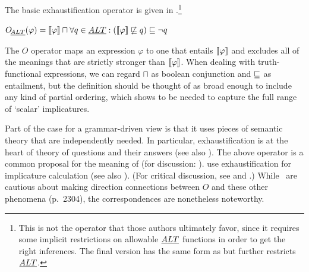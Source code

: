 \documentclass[leqno]{article}
\begin{document}
The basic exhaustification operator is given in 
\citep{Spector:2007,Fox:2007,Fox:2009,Magri:2009,ChierchiaFoxSpector08}.\footnote{This
  is not the operator that those authors ultimately favor, since it
  requires some implicit restrictions on allowable $\emph{ALT}$ functions in
  order to get the right inferences.  The final version has the same
  form as  but further restricts $\emph{ALT}$.}
%
\begin{examples}
\item\label{def:O}
  $\mathop{O\negthinspace_{\emph{ALT}}}(\varphi) = 
  \llbracket\varphi\rrbracket \sqcap 
  \forall q \in \emph{ALT} : (\llbracket\varphi\rrbracket \not\sqsubseteq q) \sqsubseteq \neg q$
\end{examples}
%
The $O$ operator maps an expression $\varphi$ to one that entails
$\llbracket\varphi\rrbracket$ and excludes all of the meanings that are strictly
stronger than $\llbracket\varphi\rrbracket$. When dealing with truth-functional
expressions, we can regard $\sqcap$ as boolean conjunction and
$\sqsubseteq$ as entailment, but the definition should be thought of as
broad enough to include any kind of partial ordering, which
 shows to be needed to capture the full
range of `scalar' implicatures.

Part of the case for a grammar-driven view is that it uses pieces of
semantic theory that are independently needed. In particular,
exhaustification is at the heart of  theory
of questions and their answers (see also
\citealt{JohnMcCarthy80}). The above operator is a common proposal for
the meaning of  (for discussion:
\citealt{Rooth96,Buring01,BeaverClark08}).  \citet{SchulzVanRooij06}
use exhaustification for implicature calculation (see also
\citealt{deJagerVanRooij07}).  (For critical discussion, see
\citealt{Alonso-Ovalle:2008} and \citealt{Gajewski:2012}.) While \CFS\
are cautious about making direction connections between $O$ and these
other phenomena (p.~2304), the correspondences are nonetheless
noteworthy.
\end{document}
